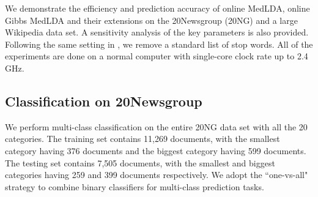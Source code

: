 \documentclass[twoside,11pt]{article}
\begin{document}
We demonstrate the efficiency and prediction accuracy of online MedLDA, online Gibbs MedLDA and their extensions on the 20Newsgroup (20NG) and a large Wikipedia data set. A sensitivity analysis of the key parameters is also provided. Following the same setting in \cite{zhu2012medlda}, we remove a standard list of stop words. All of the experiments are done on a normal computer with single-core clock rate up to 2.4 GHz.


\subsection{Classification on 20Newsgroup}
\label{sec:mc}

We perform multi-class classification on the entire 20NG data set with all the 20 categories. The training set contains 11,269 documents, with the smallest category having 376 documents and the biggest category having 599 documents. The testing set contains 7,505 documents, with the smallest and biggest categories having 259 and 399 documents respectively. We adopt the ``one-vs-all" strategy \citep{rifkin2004defense} to combine binary classifiers for multi-class prediction tasks.
\end{document}
